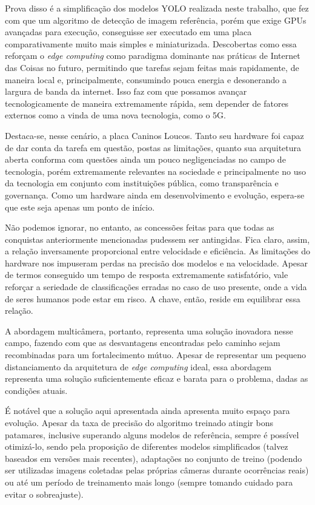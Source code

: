 \documentclass[]{politex}
\begin{document}
Prova disso é a simplificação dos modelos YOLO realizada neste trabalho, que fez com que um algoritmo de detecção de imagem referência, porém que exige GPUs avançadas para execução, conseguisse ser executado em uma placa comparativamente muito mais simples e miniaturizada. Descobertas como essa reforçam o \textit{edge computing} como paradigma dominante nas práticas de Internet das Coisas no futuro, permitindo que tarefas sejam feitas mais rapidamente, de maneira local e, principalmente, consumindo pouca energia e desonerando a largura de banda da internet. Isso faz com que possamos avançar tecnologicamente de maneira extremamente rápida, sem depender de fatores externos como a vinda de uma nova tecnologia, como o 5G.

Destaca-se, nesse cenário, a placa Caninos Loucos. Tanto seu hardware foi capaz de dar conta da tarefa em questão, postas as limitações, quanto sua arquitetura aberta conforma com questões ainda um pouco negligenciadas no campo de tecnologia, porém extremamente relevantes na sociedade e principalmente no uso da tecnologia em conjunto com instituições pública, como transparência e governança. Como um hardware ainda em desenvolvimento e evolução, espera-se que este seja apenas um ponto de início.

Não podemos ignorar, no entanto, as concessões feitas para que todas as conquistas anteriormente mencionadas pudessem ser antingidas. Fica claro, assim, a relação inversamente proporcional entre velocidade e eficiência. As limitações do hardware nos impuseram perdas na precisão dos modelos e na velocidade. Apesar de termos conseguido um tempo de resposta extremamente satisfatório, vale reforçar a seriedade de classificações erradas no caso de uso presente, onde a vida de seres humanos pode estar em risco. A chave, então, reside em equilibrar essa relação.

A abordagem multicâmera, portanto, representa uma solução inovadora nesse campo, fazendo com que as desvantagens encontradas pelo caminho sejam recombinadas para um fortalecimento mútuo. Apesar de representar um pequeno distanciamento da arquitetura de \textit{edge computing} ideal, essa abordagem representa uma solução suficientemente eficaz e barata para o problema, dadas as condições atuais.

É notável que a solução aqui apresentada ainda apresenta muito espaço para evolução. Apesar da taxa de precisão do algoritmo treinado atingir bons patamares, inclusive superando alguns modelos de referência, sempre é possível otimizá-lo, sendo pela proposição de diferentes modelos simplificados (talvez baseados em versões mais recentes), adaptações no conjunto de treino (podendo ser utilizadas imagens coletadas pelas próprias câmeras durante ocorrências reais) ou até um período de treinamento mais longo (sempre tomando cuidado para evitar o sobreajuste).
\end{document}
